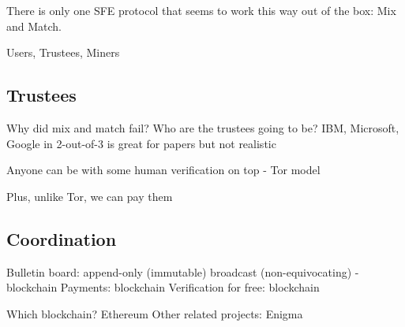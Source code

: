 There is only one SFE protocol that seems to work this way out of the box: Mix and Match.

Users, Trustees, Miners

\subsection{Trustees}

Why did mix and match fail? Who are the trustees going to be? IBM, Microsoft, Google in 2-out-of-3 is great for papers but not realistic 

Anyone can be with some human verification on top - Tor model 

Plus, unlike Tor, we can pay them

\subsection{Coordination}

Bulletin board: append-only (immutable) broadcast (non-equivocating) - blockchain
Payments: blockchain
Verification for free: blockchain

Which blockchain? Ethereum
Other related projects: Enigma

 

